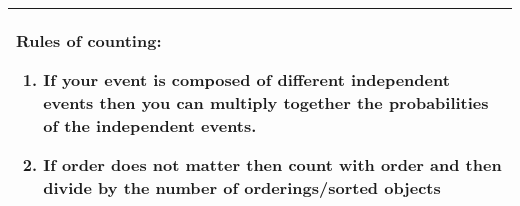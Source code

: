 {\tabulinesep=1mm
\begin{tabu}{|p{16cm} |}
\hline
\textbf{Rules of counting:}
\begin{enumerate}
\item
If your event is composed of different independent events then you can multiply together the probabilities of the independent events. 
\item
If order does not matter then count with order and then divide by the number of orderings/sorted objects 
\end{enumerate} \\
\hline
\end{tabu}
}